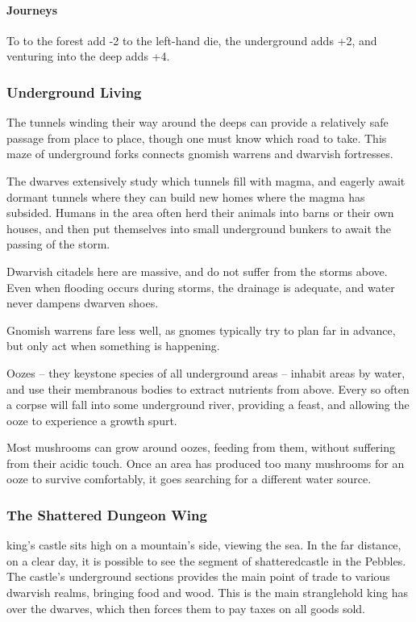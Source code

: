\begin{multicols}{2}
{  \paragraph{Journeys}
  To to the forest add -2 to the left-hand die, the underground adds +2, and venturing into the \gls{deep} adds +4.

  \encShale

  \subsubsection{Underground Living}
}
The tunnels winding their way around the deeps can provide a relatively safe passage from place to place, though one must know which road to take.
This maze of underground forks connects gnomish warrens and dwarvish fortresses.

The dwarves extensively study which tunnels fill with magma, and eagerly await dormant tunnels where they can build new homes where the magma has subsided.
Humans in the area often herd their animals into barns or their own houses, and then put themselves into small underground bunkers to await the passing of the storm.

Dwarvish citadels here are massive, and do not suffer from the storms above.
Even when flooding occurs during storms, the drainage is adequate, and water never dampens dwarven shoes.

Gnomish warrens fare less well, as gnomes typically try to plan far in advance, but only act when something is happening.

Oozes -- they keystone species of all underground areas -- inhabit areas by water, and use their membranous bodies to extract nutrients from above.
Every so often a corpse will fall into some underground river, providing a feast, and allowing the ooze to experience a growth spurt.

Most mushrooms can grow around oozes, feeding from them, without suffering from their acidic touch.
Once an area has produced too many mushrooms for an ooze to survive comfortably, it goes searching for a different water source.

\subsubsection{The Shattered Dungeon Wing}

\Gls{king}'s castle sits high on a mountain's side, viewing the sea.
In the far distance, on a clear day, it is possible to see the segment of \gls{shatteredcastle} in the Pebbles.
The castle's underground sections provides the main point of trade to various dwarvish realms, bringing food and wood.
This is the main stranglehold \gls{king} has over the dwarves, which then forces them to pay taxes on all goods sold.


\end{multicols}
